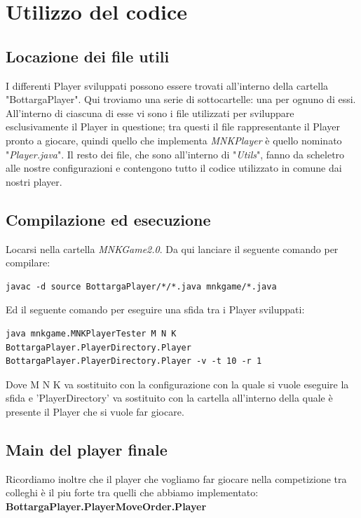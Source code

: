 \documentclass{article}
\begin{document}
\section{Utilizzo del codice}

\subsection{Locazione dei file utili}
I differenti Player sviluppati possono essere trovati all'interno della cartella "BottargaPlayer".
Qui troviamo una serie di sottocartelle: una per ognuno di essi.
All'interno di ciascuna di esse vi sono i file utilizzati per sviluppare esclusivamente il Player in questione; tra questi il file rappresentante il Player pronto a giocare, quindi quello che implementa \textit{MNKPlayer} è quello nominato "\textit{Player.java}". Il resto dei file, che sono all'interno di "\textit{Utils}", fanno da scheletro alle nostre configurazioni e contengono tutto il codice utilizzato in comune dai nostri player.


\subsection{Compilazione ed esecuzione}

Locarsi nella cartella \textit{MNKGame2.0}.
\medskip
Da qui lanciare il seguente comando per compilare:

\begin{lstlisting}
javac -d source BottargaPlayer/*/*.java mnkgame/*.java
\end{lstlisting}
\medskip
Ed il seguente comando per eseguire una sfida tra i Player sviluppati:

\begin{lstlisting}
java mnkgame.MNKPlayerTester M N K BottargaPlayer.PlayerDirectory.Player BottargaPlayer.PlayerDirectory.Player -v -t 10 -r 1
\end{lstlisting}
Dove M N K va sostituito con la configurazione con la quale si vuole eseguire la sfida e 'PlayerDirectory' va sostituito con la cartella all'interno della quale è presente il Player che si vuole far giocare.

\subsection{Main del player finale}
Ricordiamo inoltre che il player che vogliamo far giocare nella competizione tra colleghi è il piu forte tra quelli che abbiamo implementato: \textbf{BottargaPlayer.PlayerMoveOrder.Player}
\end{document}
